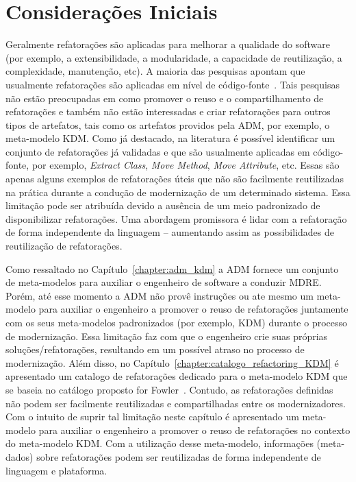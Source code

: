 
\section{Considerações Iniciais}\label{sec:consideracoes_iniciais}

Geralmente refatorações são aplicadas para melhorar a qualidade do software (por exemplo, a extensibilidade, a modularidade, a capacidade de reutilização, a complexidade, manutenção, etc). 
A maioria das pesquisas apontam que usualmente refatorações são aplicadas em nível de código-fonte~\cite{Fowler1999, Demeyer1, Demeyer2, Opdy92b}. Tais pesquisas não estão preocupadas em como promover o reuso e o compartilhamento de refatorações e também não estão interessadas e criar refatorações para outros tipos de artefatos, tais como os artefatos providos pela ADM, por exemplo, o meta-modelo KDM. 
%
Como já destacado, na literatura é possível identificar um conjunto de refatorações já validadas e que são usualmente aplicadas em código-fonte, por exemplo, \textit{Extract Class}, \textit{Move Method}, \textit{Move Attribute}, etc. Essas são apenas alguns exemplos de refatorações úteis que não são facilmente reutilizadas na prática durante a condução de modernização de um determinado sistema. Essa limitação pode ser atribuída devido a ausência de um meio padronizado de disponibilizar refatorações. 
Uma abordagem promissora é lidar com a refatoração de forma independente da linguagem – aumentando assim as possibilidades de reutilização de refatorações.

Como ressaltado no Capítulo~\ref{chapter:adm_kdm} a ADM fornece um conjunto de meta-modelos para auxiliar o engenheiro de software a conduzir MDRE. 
Porém, até esse momento a ADM não provê instruções ou ate mesmo um meta-modelo para auxiliar o engenheiro a promover o reuso de refatorações juntamente com os seus meta-modelos padronizados (por exemplo, KDM) durante o processo de modernização. 
Essa limitação faz com que o engenheiro crie suas próprias soluções/refatorações, resultando em um possível atraso no processo de modernização. 
Além disso, no Capítulo~\ref{chapter:catalogo_refactoring_KDM} é apresentado um catalogo de refatorações dedicado para o meta-modelo KDM que se baseia no catálogo proposto for Fowler~\cite{Fowler1999}. Contudo, as refatorações definidas não podem ser facilmente reutilizadas e compartilhadas entre os modernizadores. 
Com o intuito de suprir tal limitação neste capítulo é apresentado um meta-modelo para auxiliar o engenheiro a promover o reuso de refatorações no contexto do meta-modelo KDM. Com a utilização desse meta-modelo, informações (meta-dados) sobre refatorações podem ser reutilizadas de forma independente de linguagem e plataforma. 

